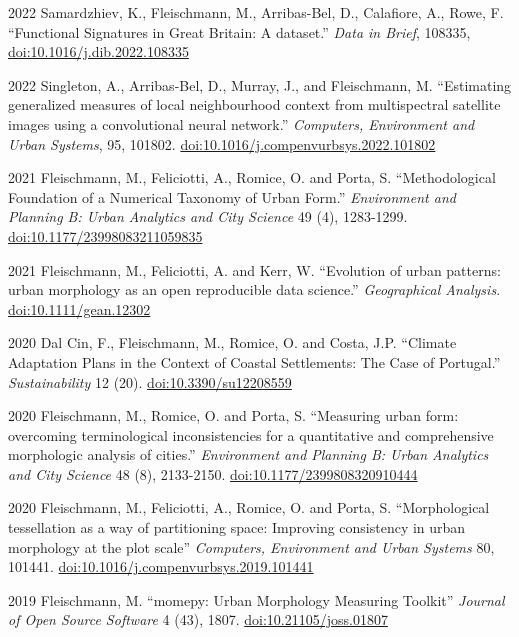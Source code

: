 \documentclass[12pt,a4paper]{report}
\begin{document}
    \begin{tablist}

        \item[2022] \tab{}Samardzhiev, K., Fleischmann, M., Arribas-Bel, D., Calafiore, A., Rowe, F. \enquote{Functional Signatures in Great Britain: A dataset.} \textit{Data in Brief}, 108335, \href{https://doi.org/10.1016/j.dib.2022.108335}{doi:10.1016/j.dib.2022.108335}

        \item[2022] \tab{}Singleton, A., Arribas-Bel, D., Murray, J., and Fleischmann, M. \enquote{Estimating generalized measures of local neighbourhood context from multispectral satellite images using a convolutional neural network.} \textit{Computers, Environment and Urban Systems}, 95, 101802. \href{https://doi.org/10.1016/j.compenvurbsys.2022.101802}{doi:10.1016/j.compenvurbsys.2022.101802}

        \item[2021] \tab{}Fleischmann, M., Feliciotti, A., Romice, O. and Porta, S. \enquote{Methodological Foundation of a Numerical Taxonomy of Urban Form.}  \textit{Environment and Planning B: Urban Analytics and City Science} 49 (4), 1283-1299. \href{https://doi.org/10.1177/23998083211059835}{doi:10.1177/23998083211059835}

        \item[2021] \tab{}Fleischmann, M., Feliciotti, A. and Kerr, W. \enquote{Evolution of urban patterns: urban morphology as an open reproducible data science.} \textit{Geographical Analysis}. \href{https://doi.org/10.1111/gean.12302}{doi:10.1111/gean.12302}

        \item[2020] \tab{}Dal Cin, F., Fleischmann, M., Romice, O. and Costa, J.P. \enquote{Climate Adaptation Plans in the Context of Coastal Settlements: The Case of Portugal.} \textit{Sustainability} 12 (20). \href{https://doi.org/10.3390/su12208559}{doi:10.3390/su12208559}

        \item[2020] \tab{}Fleischmann, M., Romice, O. and Porta, S. \enquote{Measuring urban form: overcoming terminological inconsistencies for a quantitative and comprehensive morphologic analysis of cities.} \textit{Environment and Planning B: Urban Analytics and City Science} 48 (8), 2133-2150. \href{https://doi.org/10.1177/2399808320910444}{doi:10.1177/2399808320910444}

        \item[2020] \tab{}Fleischmann, M., Feliciotti, A., Romice, O. and Porta, S. \enquote{Morphological tessellation as a way of partitioning space: Improving consistency in urban morphology at the plot scale} \textit{Computers, Environment and Urban Systems} 80, 101441. \href{https://doi.org/10.1016/j.compenvurbsys.2019.101441}{doi:10.1016/j.compenvurbsys.2019.101441}

        \item[2019] \tab{}Fleischmann, M. \enquote{momepy: Urban Morphology Measuring Toolkit} \textit{Journal of Open Source Software} 4 (43), 1807. \href{https://doi.org/10.21105/joss.01807}{doi:10.21105/joss.01807}


    \end{tablist}
\end{document}
